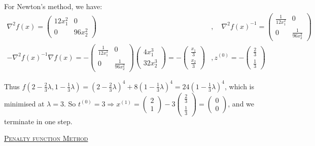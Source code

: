 \begin{example}
    For Newton's method, we have:
    \begin{align*}
        \nabla^2 f(x)=\left(\begin{array}{cc}
        12 x_1^2 & 0 \\
        0 & 96 x_2^2
        \end{array}\right)&, \quad \nabla^2 f(x)^{-1}=\left(\begin{array}{cc}
            \frac{1}{12 x_1^2} & 0 \\
            0 & \frac{1}{96 x_2^2}
        \end{array}\right)\\
        -\nabla^2 f(x)^{-1} \nabla f(x)=-\left(\begin{array}{cc}\frac{1}{12 x_1^2} & 0 \\ 0 & \frac{1}{96 x_2^2}\end{array}\right)\left(\begin{array}{c}4 x_1^3 \\ 32 x_2^3\end{array}\right)=-\left(\begin{array}{c}\frac{x_1}{3} \\ \frac{x_2}{3}\end{array}\right)&, z^{(0)}=-\left(\begin{array}{c}
             \frac{2}{3}  \\
             \frac{1}{3}
        \end{array}\right)
    \end{align*}

    Thus $f(2-\frac{2}{3}\lambda, 1 - \frac{1}{3}\lambda) = (2- \frac{2}{3}\lambda)^4 + 8(1-\frac{1}{3}\lambda)^4 = 24(1-\frac{1}{3}\lambda)^4$, which is minimised at $\lambda = 3$. So $t^{(0)} = 3\Longrightarrow x^{(1)} = \left(\begin{array}{c}
         2  \\
         1 
    \end{array}\right) - 3\left(\begin{array}{c}
         \frac{2}{3}  \\
         \frac{1}{3}
    \end{array}\right) = \left(\begin{array}{c}
         0  \\
         0 
    \end{array}\right)$, and we terminate in one step.
\end{example}

\uline{\textcolor{MarkerColour}{\textsc{Penalty function Method}}}

